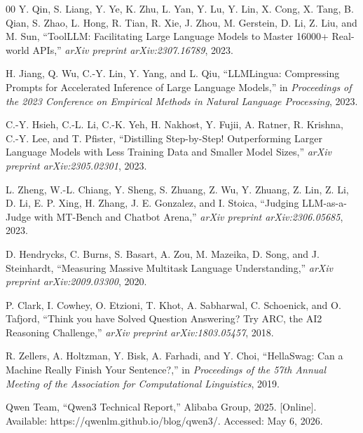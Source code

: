 \documentclass[conference]{IEEEtran}
\begin{document}
\begin{thebibliography}{00}
 Y. Qin, S. Liang, Y. Ye, K. Zhu, L. Yan, Y. Lu, Y. Lin, X. Cong, X. Tang, B. Qian, S. Zhao, L. Hong, R. Tian, R. Xie, J. Zhou, M. Gerstein, D. Li, Z. Liu, and M. Sun, ``ToolLLM: Facilitating Large Language Models to Master 16000+ Real-world APIs,'' \textit{arXiv preprint arXiv:2307.16789}, 2023.

 H. Jiang, Q. Wu, C.-Y. Lin, Y. Yang, and L. Qiu, ``LLMLingua: Compressing Prompts for Accelerated Inference of Large Language Models,'' in \textit{Proceedings of the 2023 Conference on Empirical Methods in Natural Language Processing}, 2023.

 C.-Y. Hsieh, C.-L. Li, C.-K. Yeh, H. Nakhost, Y. Fujii, A. Ratner, R. Krishna, C.-Y. Lee, and T. Pfister, ``Distilling Step-by-Step! Outperforming Larger Language Models with Less Training Data and Smaller Model Sizes,'' \textit{arXiv preprint arXiv:2305.02301}, 2023.

 L. Zheng, W.-L. Chiang, Y. Sheng, S. Zhuang, Z. Wu, Y. Zhuang, Z. Lin, Z. Li, D. Li, E. P. Xing, H. Zhang, J. E. Gonzalez, and I. Stoica, ``Judging LLM-as-a-Judge with MT-Bench and Chatbot Arena,'' \textit{arXiv preprint arXiv:2306.05685}, 2023.

 D. Hendrycks, C. Burns, S. Basart, A. Zou, M. Mazeika, D. Song, and J. Steinhardt, ``Measuring Massive Multitask Language Understanding,'' \textit{arXiv preprint arXiv:2009.03300}, 2020.

 P. Clark, I. Cowhey, O. Etzioni, T. Khot, A. Sabharwal, C. Schoenick, and O. Tafjord, ``Think you have Solved Question Answering? Try ARC, the AI2 Reasoning Challenge,'' \textit{arXiv preprint arXiv:1803.05457}, 2018.

 R. Zellers, A. Holtzman, Y. Bisk, A. Farhadi, and Y. Choi, ``HellaSwag: Can a Machine Really Finish Your Sentence?,'' in \textit{Proceedings of the 57th Annual Meeting of the Association for Computational Linguistics}, 2019.

 Qwen Team, ``Qwen3 Technical Report,'' Alibaba Group, 2025. [Online]. Available: https://qwenlm.github.io/blog/qwen3/. Accessed: May 6, 2026.

\end{thebibliography}
\end{document}
